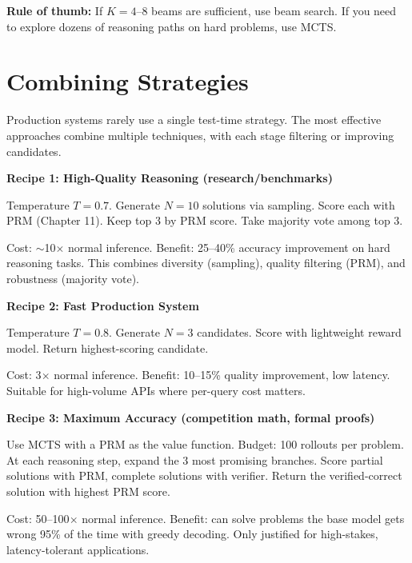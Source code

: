 \begin{chapterenv}
\begin{tipbox}
\textbf{Rule of thumb:} If $K = 4$--$8$ beams are sufficient, use beam search. If you need to explore dozens of reasoning paths on hard problems, use MCTS.
\end{tipbox}

\section{Combining Strategies}

Production systems rarely use a single test-time strategy. The most effective approaches combine multiple techniques, with each stage filtering or improving candidates.

\begin{infobox}
\textbf{Recipe 1: High-Quality Reasoning (research/benchmarks)}

Temperature $T = 0.7$. Generate $N = 10$ solutions via sampling. Score each with PRM (Chapter 11). Keep top 3 by PRM score. Take majority vote among top 3.

Cost: $\sim$10$\times$ normal inference. Benefit: 25--40\% accuracy improvement on hard reasoning tasks. This combines diversity (sampling), quality filtering (PRM), and robustness (majority vote).
\end{infobox}

\begin{infobox}
\textbf{Recipe 2: Fast Production System}

Temperature $T = 0.8$. Generate $N = 3$ candidates. Score with lightweight reward model. Return highest-scoring candidate.

Cost: 3$\times$ normal inference. Benefit: 10--15\% quality improvement, low latency. Suitable for high-volume APIs where per-query cost matters.
\end{infobox}

\begin{infobox}
\textbf{Recipe 3: Maximum Accuracy (competition math, formal proofs)}

Use MCTS with a PRM as the value function. Budget: 100 rollouts per problem. At each reasoning step, expand the 3 most promising branches. Score partial solutions with PRM, complete solutions with verifier. Return the verified-correct solution with highest PRM score.

Cost: 50--100$\times$ normal inference. Benefit: can solve problems the base model gets wrong 95\% of the time with greedy decoding. Only justified for high-stakes, latency-tolerant applications.
\end{infobox}


\end{chapterenv}
